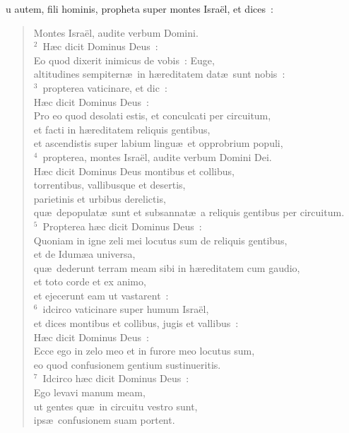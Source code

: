 \bchapter
{}u autem, fili hominis, propheta super montes Isra\"el, et dices~: \begin{verse}\vspace{6pt}Montes Isra\"el, audite verbum Domini.\\
${}^{2}$~H\ae c dicit Dominus Deus~:\\ Eo quod dixerit inimicus de vobis~: Euge,\\ altitudines sempitern\ae\ in h\ae reditatem dat\ae\ sunt nobis~:\\
${}^{3}$~propterea vaticinare, et dic~:\\ H\ae c dicit Dominus Deus~:\\ Pro eo quod desolati estis, et conculcati per circuitum,\\ et facti in h\ae reditatem reliquis gentibus,\\ et ascendistis super labium lingu\ae\ et opprobrium populi,\\
${}^{4}$~propterea, montes Isra\"el, audite verbum Domini Dei.\\ H\ae c dicit Dominus Deus montibus et collibus,\\ torrentibus, vallibusque et desertis,\\ parietinis et urbibus derelictis,\\ qu\ae\ depopulat\ae\ sunt et subsannat\ae\ a reliquis gentibus per circuitum.\\
${}^{5}$~Propterea h\ae c dicit Dominus Deus~:\\ Quoniam in igne zeli mei locutus sum de reliquis gentibus,\\ et de Idum\ae a universa,\\ qu\ae\ dederunt terram meam sibi in h\ae reditatem cum gaudio,\\ et toto corde et ex animo,\\ et ejecerunt eam ut vastarent~:\\
${}^{6}$~idcirco vaticinare super humum Isra\"el,\\ et dices montibus et collibus, jugis et vallibus~:\\ H\ae c dicit Dominus Deus~:\\ Ecce ego in zelo meo et in furore meo locutus sum,\\ eo quod confusionem gentium sustinueritis.\\
${}^{7}$~Idcirco h\ae c dicit Dominus Deus~:\\ Ego levavi manum meam,\\ ut gentes qu\ae\ in circuitu vestro sunt,\\ ips\ae\ confusionem suam portent.\\

\end{verse}
